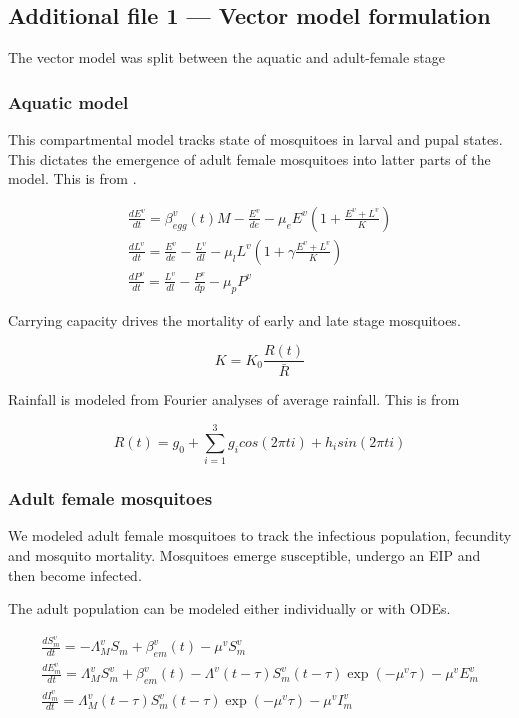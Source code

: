 \documentclass{bmcart}
\begin{document}
\begin{backmatter}
  \subsection*{Additional file 1 --- Vector model formulation}

The vector model was split between the aquatic and adult-female stage

\subsubsection*{Aquatic model}

This compartmental model tracks state of mosquitoes in larval and pupal states. This dictates the emergence of adult female mosquitoes into latter parts of the model. This is from \cite{griffin_reducing_2010}.

\begin{gather*}
    \frac{dE^v}{dt} = \beta_{egg}^v(t) M - \frac{E^v}{de} - \mu_e E^v \left(1 + \frac{E^v + L^v}{K}\right) \\
    \frac{dL^v}{dt} = \frac{E^v}{de} - \frac{L^v}{dl} - \mu_l L^v \left(1 + \gamma \frac{E^v + L^v}{K}\right)  \\
    \frac{dP^v}{dt} = \frac{L^v}{dl} - \frac{P^v}{dp} - \mu_p P^v
\end{gather*}

Carrying capacity drives the mortality of early and late stage mosquitoes.

\[
K = K_0 \frac{R(t)}{\bar{R}}
\]

Rainfall is modeled from Fourier analyses of average rainfall. This is from \cite{winskill_us_2017}

\[
R(t) = g_0 + \sum_{i=1}^3 g_i cos(2\pi t i) + h_i sin(2\pi t i)
\]

\subsubsection*{Adult female mosquitoes}

We modeled adult female mosquitoes to track the infectious population, fecundity and mosquito mortality. Mosquitoes emerge susceptible, undergo an EIP and then become infected.

The adult population can be modeled either individually or with ODEs.

\begin{gather*}
    \frac{dS^v_m}{dt} = -\Lambda_M^v S_m + \beta_{em}^v(t) - \mu^v S^v_m \\
    \frac{dE^v_m}{dt} = \Lambda_M^v S^v_m + \beta_{em}^v(t) - \Lambda^v(t - \tau) S^v_m(t - \tau) \exp(-\mu^v\tau) - \mu^v E^v_m \\
    \frac{dI^v_m}{dt} = \Lambda_M^v(t - \tau) S^v_m(t - \tau) \exp(-\mu^v\tau) - \mu^v I^v_m
\end{gather*}


\end{backmatter}
\end{document}
